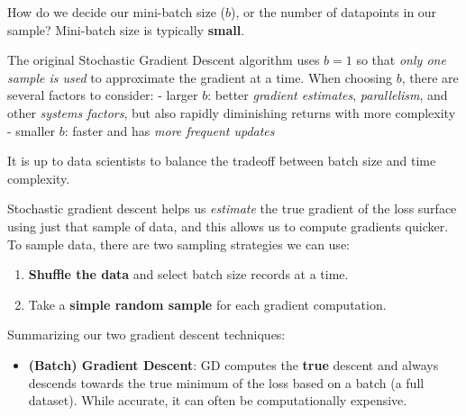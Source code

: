 \documentclass[
  letterpaper,
  DIV=11,
  numbers=noendperiod]{scrreprt}
\providecommand{\tightlist}{%
  \setlength{\itemsep}{0pt}\setlength{\parskip}{0pt}}\usepackage{longtable,booktabs,array}
\begin{document}
\begin{tcolorbox}[enhanced jigsaw, arc=.35mm, left=2mm, toprule=.15mm, leftrule=.75mm, bottomrule=.15mm, colframe=quarto-callout-tip-color-frame, rightrule=.15mm, colbacktitle=quarto-callout-tip-color!10!white, opacitybacktitle=0.6, coltitle=black, bottomtitle=1mm, colback=white, toptitle=1mm, title=\textcolor{quarto-callout-tip-color}{\faLightbulb}\hspace{0.5em}{Tip}, breakable, opacityback=0, titlerule=0mm]

How do we decide our mini-batch size (\(b\)), or the number of
datapoints in our sample? Mini-batch size is typically \textbf{small}.

The original Stochastic Gradient Descent algorithm uses \(b=1\) so that
\emph{only one sample is used} to approximate the gradient at a time.
When choosing \(b\), there are several factors to consider: - larger
\(b\): better \emph{gradient estimates}, \emph{parallelism}, and other
\emph{systems factors}, but also rapidly diminishing returns with more
complexity - smaller \(b\): faster and has \emph{more frequent updates}

It is up to data scientists to balance the tradeoff between batch size
and time complexity.

Stochastic gradient descent helps us \emph{estimate} the true gradient
of the loss surface using just that sample of data, and this allows us
to compute gradients quicker. To sample data, there are two sampling
strategies we can use:

\begin{enumerate}
\def\labelenumi{\arabic{enumi}.}
\tightlist
\item
  \textbf{Shuffle the data} and select batch size records at a time.
\item
  Take a \textbf{simple random sample} for each gradient computation.
\end{enumerate}

\end{tcolorbox}

Summarizing our two gradient descent techniques:

\begin{itemize}
\tightlist
\item
  \textbf{(Batch) Gradient Descent}: GD computes the \textbf{true}
  descent and always descends towards the true minimum of the loss based
  on a batch (a full dataset). While accurate, it can often be
  computationally expensive.
\end{itemize}
\end{document}
